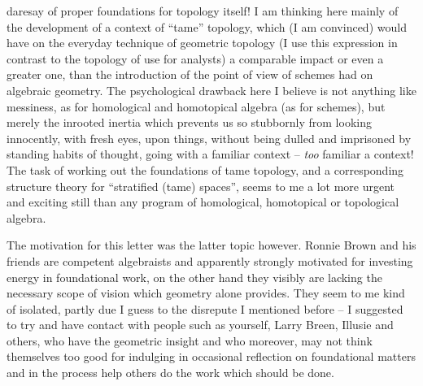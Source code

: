 daresay of proper foundations for topology itself! I am thinking here
mainly of the development of a context of ``tame'' topology, which (I
am convinced) would have on the everyday technique of geometric
topology (I use this expression in contrast to the topology of use for
analysts) a comparable impact or even a greater one, than the
introduction of the point of view of schemes had on algebraic
geometry. The psychological drawback here I believe is not anything
like messiness, as for homological and homotopical algebra (as for
schemes), but merely the inrooted inertia which prevents us so
stubbornly from looking innocently, with fresh eyes, upon things,
without being dulled and imprisoned by standing habits of thought,
going with a familiar context -- \emph{too} familiar a context! The
task of working out the foundations of tame topology, and a
corresponding structure theory for ``stratified (tame) spaces'', seems
to me a lot more urgent and exciting still
than any program of homological,
homotopical or topological algebra.

\label{sec:2}%
The motivation for this letter was the latter topic
however. Ronnie Brown and his friends are competent algebraists and
apparently strongly motivated for investing energy in foundational
work, on the other hand they visibly are lacking the necessary scope
of vision which geometry alone provides. They seem to me kind of
isolated, partly due I guess to the disrepute I mentioned before -- I
suggested to try and have contact with people such as yourself, Larry
Breen, Illusie and others, who have the geometric insight and who
moreover, may not think themselves too good for indulging in
occasional reflection on foundational matters and in the process help
others do the work which should be done.

